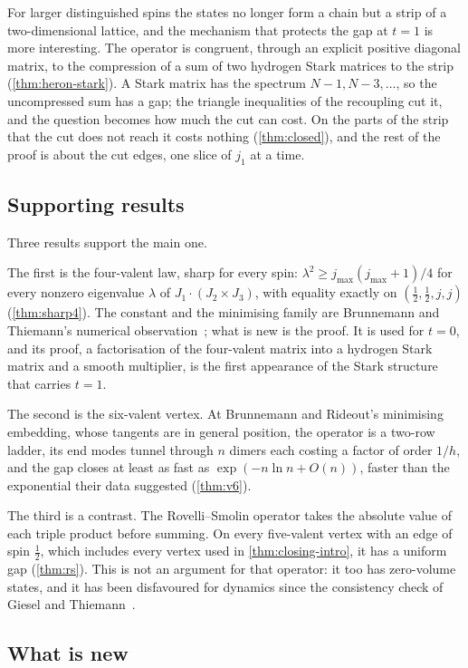 For larger distinguished spins the states no longer form a chain but a strip of a
two-dimensional lattice, and the mechanism that protects the gap at $t=1$ is more
interesting. The operator is congruent, through an explicit positive diagonal
matrix, to the compression of a sum of two hydrogen Stark matrices to the strip
(\cref{thm:heron-stark}). A Stark matrix has the spectrum $N-1,N-3,\dots$, so the
uncompressed sum has a gap; the triangle inequalities of the recoupling cut it, and
the question becomes how much the cut can cost. On the parts of the strip that the
cut does not reach it costs nothing (\cref{thm:closed}), and the rest of the proof is
about the cut edges, one slice of $j_1$ at a time.

\subsection{Supporting results}

Three results support the main one.

The first is the four-valent law, sharp for every spin:
$\lambda^2\ge j_{\max}(j_{\max}+1)/4$ for every nonzero eigenvalue $\lambda$ of
$J_1\cdot(J_2\times J_3)$, with equality exactly on $(\frac12,\frac12,j,j)$
(\cref{thm:sharp4}). The constant and the minimising family are Brunnemann and
Thiemann's numerical observation~\cite[p.~38]{BT2006}; what is new is the proof. It is
used for $t=0$, and its proof, a factorisation of the four-valent matrix into a
hydrogen Stark matrix and a smooth multiplier, is the first appearance of the Stark
structure that carries $t=1$.

The second is the six-valent vertex. At Brunnemann and Rideout's minimising
embedding, whose tangents are in general position, the operator is a two-row ladder, its end modes tunnel through
$n$ dimers each costing a factor of order $1/h$, and the gap closes at least as fast
as $\exp(-n\ln n+O(n))$, faster than the exponential their data suggested
(\cref{thm:v6}).

The third is a contrast. The Rovelli--Smolin operator takes the absolute value of
each triple product before summing. On every five-valent vertex with an edge of spin
$\frac12$, which includes every vertex used in \cref{thm:closing-intro}, it has a
uniform gap (\cref{thm:rs}). This is not an argument for that operator: it too has
zero-volume states, and it has been disfavoured for dynamics since the
consistency check of Giesel and Thiemann~\cite{GT2006}.

\subsection{What is new}

